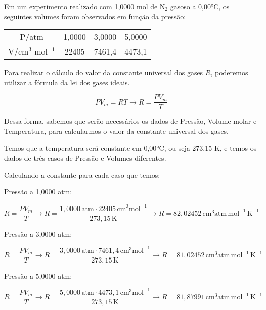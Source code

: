 \begin{xcs}
    Em um experimento realizado com 1,0000 mol de N\(_2\) gasoso a 0,00°C, os
    seguintes volumes foram observados em função da pressão: 
    \begin{center}
    \begin{tabular}{c | c c c}
    \hline
        P/atm & 1,0000 & 3,0000 & 5,0000\\
        V/cm\(^3\) mol\(^{-1}\) & 22405 & 7461,4 & 4473,1\\
    \hline
    \end{tabular}
    \end{center}
\end{xcs}
\begin{rsl}
    
\end{rsl}

Para realizar o cálculo do valor da constante universal dos gases \( R \), poderemos utilizar a fórmula da lei dos gases ideais.

\[
PV_m = RT \rightarrow R = \frac{PV_m}{T}
\]

Dessa forma, sabemos que serão necessários os dados de Pressão, Volume molar e Temperatura, para calcularmos o valor da constante universal dos gases.

Temos que a temperatura será constante em 0,00°C, ou seja 273,15 K, e temos os dados de três casos de Pressão e Volumes diferentes.

Calculando a constante para cada caso que temos:

Pressão a 1,0000 atm:

\[
R = \frac{PV_m}{T} \rightarrow R = \frac{1,0000 \, \text{atm} \cdot 22405 \, \text{cm}^3 \text{mol}^{-1}}{273,15 \, \text{K}} \rightarrow R = 82,02452 \, \text{cm}^3 \text{atm} \, \text{mol}^{-1} \, \text{K}^{-1}
\]

Pressão a 3,0000 atm:

\[
R = \frac{PV_m}{T} \rightarrow R = \frac{3,0000 \, \text{atm} \cdot 7461,4 \, \text{cm}^3 \text{mol}^{-1}}{273,15 \, \text{K}} \rightarrow R = 81,02452 \, \text{cm}^3 \text{atm} \, \text{mol}^{-1} \, \text{K}^{-1}
\]

Pressão a 5,0000 atm:

\[
R = \frac{PV_m}{T} \rightarrow R = \frac{5,0000 \, \text{atm} \cdot 4473,1 \, \text{cm}^3 \text{mol}^{-1}}{273,15 \, \text{K}} \rightarrow R = 81,87991 \, \text{cm}^3 \text{atm} \, \text{mol}^{-1} \, \text{K}^{-1}
\]
